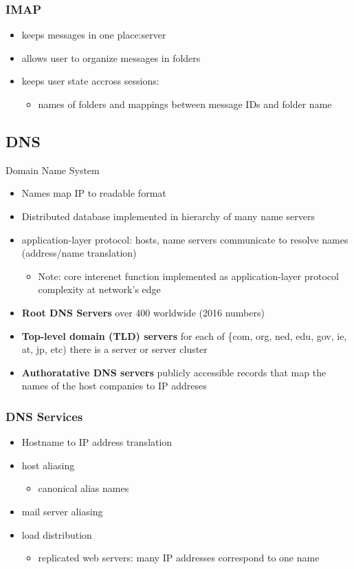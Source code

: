 \documentclass[11pt]{article}
\begin{document}
\subsubsection{IMAP}
\label{sec:orgf058d82}
\begin{itemize}
\item keeps messages in one place:server
\item allows user to organize messages in folders
\item keeps user state accross sessions:
\begin{itemize}
\item names of folders and mappings between message IDs and folder name
\end{itemize}
\end{itemize}

\subsection{DNS}
\label{sec:org48fec2e}
Domain Name System

\begin{itemize}
\item Names map IP to readable format
\item Distributed database implemented in hierarchy of many name servers
\item application-layer protocol: hosts, name servers communicate to
resolve names (address/name translation)
\begin{itemize}
\item Note: core interenet function implemented as application-layer
protocol complexity at network's edge
\end{itemize}

\item \textbf{Root DNS Servers} over 400 worldwide (2016 numbers)
\item \textbf{Top-level domain (TLD) servers} for each of \{com, org, ned, edu,
gov, ie, at, jp, etc) there is a server or server cluster
\item \textbf{Authoratative DNS servers} publicly accessible records that map the
names of the host companies to IP addreses
\end{itemize}


\subsubsection{DNS Services}
\label{sec:org42cbe28}
\begin{itemize}
\item Hostname to IP address translation
\item host aliasing
\begin{itemize}
\item canonical alias names
\end{itemize}
\item mail server aliasing
\item load distribution 
\begin{itemize}
\item replicated web servers: many IP addresses correspond to one name
\end{itemize}
\end{itemize}
\end{document}
